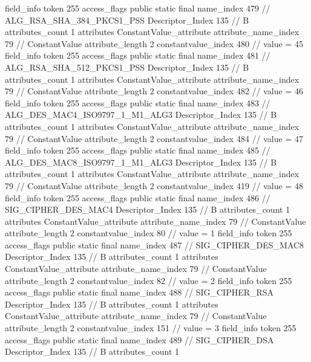 {{{{{{{				}
				}
			}
			field_info {
				token	255
				access_flags	public static final
				name_index	479		// ALG_RSA_SHA_384_PKCS1_PSS
				Descriptor_Index	135		// B
				attributes_count	1
				attributes {
				ConstantValue_attribute {
					attribute_name_index	79		// ConstantValue
					attribute_length	2
					constantvalue_index	480		// value = 45
				}
				}
			}
			field_info {
				token	255
				access_flags	public static final
				name_index	481		// ALG_RSA_SHA_512_PKCS1_PSS
				Descriptor_Index	135		// B
				attributes_count	1
				attributes {
				ConstantValue_attribute {
					attribute_name_index	79		// ConstantValue
					attribute_length	2
					constantvalue_index	482		// value = 46
				}
				}
			}
			field_info {
				token	255
				access_flags	public static final
				name_index	483		// ALG_DES_MAC4_ISO9797_1_M1_ALG3
				Descriptor_Index	135		// B
				attributes_count	1
				attributes {
				ConstantValue_attribute {
					attribute_name_index	79		// ConstantValue
					attribute_length	2
					constantvalue_index	484		// value = 47
				}
				}
			}
			field_info {
				token	255
				access_flags	public static final
				name_index	485		// ALG_DES_MAC8_ISO9797_1_M1_ALG3
				Descriptor_Index	135		// B
				attributes_count	1
				attributes {
				ConstantValue_attribute {
					attribute_name_index	79		// ConstantValue
					attribute_length	2
					constantvalue_index	419		// value = 48
				}
				}
			}
			field_info {
				token	255
				access_flags	public static final
				name_index	486		// SIG_CIPHER_DES_MAC4
				Descriptor_Index	135		// B
				attributes_count	1
				attributes {
				ConstantValue_attribute {
					attribute_name_index	79		// ConstantValue
					attribute_length	2
					constantvalue_index	80		// value = 1
				}
				}
			}
			field_info {
				token	255
				access_flags	public static final
				name_index	487		// SIG_CIPHER_DES_MAC8
				Descriptor_Index	135		// B
				attributes_count	1
				attributes {
				ConstantValue_attribute {
					attribute_name_index	79		// ConstantValue
					attribute_length	2
					constantvalue_index	82		// value = 2
				}
				}
			}
			field_info {
				token	255
				access_flags	public static final
				name_index	488		// SIG_CIPHER_RSA
				Descriptor_Index	135		// B
				attributes_count	1
				attributes {
				ConstantValue_attribute {
					attribute_name_index	79		// ConstantValue
					attribute_length	2
					constantvalue_index	151		// value = 3
				}
				}
			}
			field_info {
				token	255
				access_flags	public static final
				name_index	489		// SIG_CIPHER_DSA
				Descriptor_Index	135		// B
				attributes_count	1
}}}}}
